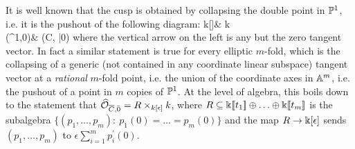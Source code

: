 \begin{rmk}
 It is well known that the cusp is obtained by collapsing the double point in $\mathbb P^1$, i.e. it is the pushout of the following diagram:
 \bcd
 \Spec k[\epsilon]\ar[r]\ar[d] & \Spec k\ar[d] \\
 (\PP^1,0)\ar[r] & (\overline C, \bar 0)
 \ecd
 where the vertical arrow on the left is any but the zero tangent vector. In fact a similar statement is true for every elliptic $m$-fold, which is the collapsing of a generic (not contained in any coordinate linear subspace) tangent vector at a \emph{rational} $m$-fold point, i.e. the union of the coordinate axes in $\mathbb{A}^m$, i.e. the pushout of a point in $m$ copies of $\mathbb P^1$. At the level of algebra, this boils down to the statement that $\widehat{\mathcal{O}}_{\overline C,\bar 0}= R\times_{k[\epsilon]} k$, where $R\subseteq \Bbbk[\![t_1]\!]\oplus\ldots\oplus \Bbbk[\![t_m]\!]$ is the subalgebra $\{(p_1,\ldots,p_m):\ p_1(0)=\ldots=p_m(0)\}$ and the map $R\rightarrow \Bbbk[\epsilon]$ sends $(p_1,\ldots,p_m)$ to $\epsilon\sum_{i=1}^m p_i^\prime(0)$.
\end{rmk}

